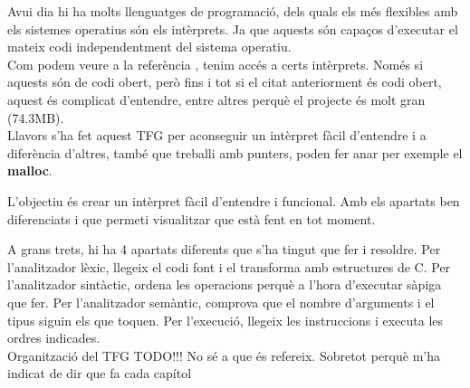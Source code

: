 Avui dia hi ha molts llenguatges de programació,
dels quals els més flexibles amb els sistemes operatius són els intèrprets.
Ja que aquests són capaços d'executar el mateix codi
independentment del sistema operatiu.\\

Com podem veure a la referència \cite{git:cpython},
tenim accés a certs intèrprets.
Només si aquests són de codi obert, però fins i tot si el citat anteriorment és codi obert,
aquest és complicat d'entendre, entre altres perquè el projecte és molt gran (74.3MB).\\

Llavors s'ha fet aquest TFG per aconseguir un intèrpret fàcil d'entendre
i a diferència d'altres, també que treballi amb punters, poden fer anar per exemple el \textbf{malloc}.


L'objectiu és crear un intèrpret fàcil d'entendre i funcional.
Amb els apartats ben diferenciats i que permeti visualitzar que està fent en tot moment.

A grans trets, hi ha 4 apartats diferents que s'ha tingut que fer i resoldre.
Per l'analitzador lèxic, llegeix el codi font i el transforma amb estructures de C.
Per l'analitzador sintàctic, ordena les operacions perquè a l'hora d'executar sàpiga que fer.
Per l'analitzador semàntic, comprova que el nombre d'arguments i el tipus siguin els que toquen.
Per l'execució, llegeix les instruccions i executa les ordres indicades.\\

Organització del TFG TODO!!!
{\color{blue}No sé a que és refereix. Sobretot perquè m'ha indicat de dir que fa cada capítol}

